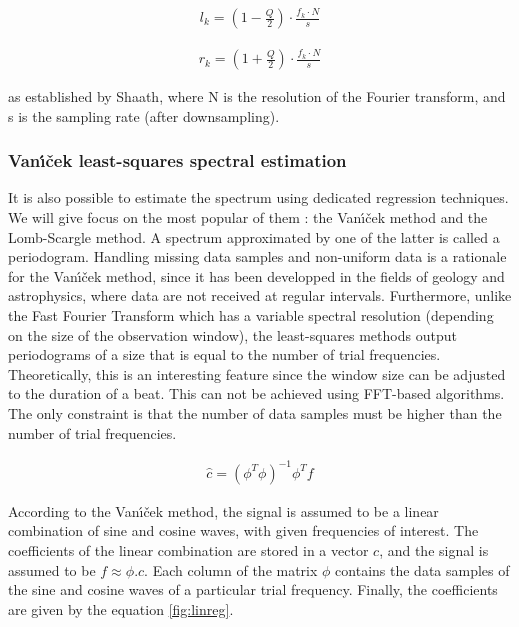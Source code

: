 \documentclass[letterpaper]{article}
\begin{document}
\begin{align}
l_k  = (1 - \frac{Q}{2}) \cdot \frac{f_k \cdot N}{s}
\end{align}

\begin{align}
r_k  = (1 + \frac{Q}{2}) \cdot \frac{f_k \cdot N}{s}
\end{align}

\noindent as established by Sha\textquotesingle ath, where N is the resolution of the Fourier transform, and s is the sampling rate (after downsampling).

\subsubsection{Van\'{\i}\v{c}ek least-squares spectral estimation}

It is also possible to estimate the spectrum using dedicated regression techniques. We will give focus on the most popular of them :
the Van\'{\i}\v{c}ek method and the Lomb-Scargle method. A spectrum approximated by one of the latter is called a periodogram.
Handling missing data samples and non-uniform data is a rationale for the Van\'{\i}\v{c}ek method, since it has been developped in the fields of
geology and astrophysics, where data are not received at regular intervals. Furthermore, unlike the Fast Fourier Transform which has a
variable spectral resolution (depending on the size of the observation window), the least-squares methods output periodograms of a size
that is equal to the number of trial frequencies. Theoretically, this is an interesting feature since the window size can be adjusted to the duration of a beat. This can not be achieved using FFT-based algorithms. The only constraint is that the number of data samples must be higher than the number of trial frequencies.

\begin{align}
\hat{c} = (\phi^{T} \phi)^{-1} \phi^{T} f
\label{fig:linreg}
\end{align}

According to the Van\'{\i}\v{c}ek method, the signal is assumed to be a linear combination of sine and cosine waves, with given frequencies of interest.
The coefficients of the linear combination are stored in a vector $c$, and the signal is assumed to be $f \approx \phi.c$. 
Each column of the matrix $\phi$ contains the data samples of the sine and cosine waves of a particular trial frequency.
Finally, the coefficients are given by the equation \ref{fig:linreg}. \citep{PS}\\
\end{document}
